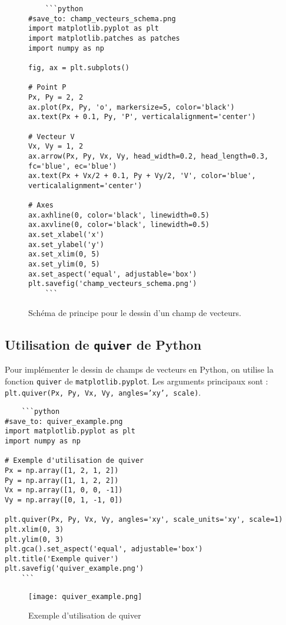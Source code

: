 \documentclass[oneside]{book}
\begin{document}
\begin{figure}[H]
    \centering
    \begin{verbatim}
    ```python
#save_to: champ_vecteurs_schema.png
import matplotlib.pyplot as plt
import matplotlib.patches as patches
import numpy as np

fig, ax = plt.subplots()

# Point P
Px, Py = 2, 2
ax.plot(Px, Py, 'o', markersize=5, color='black')
ax.text(Px + 0.1, Py, 'P', verticalalignment='center')

# Vecteur V
Vx, Vy = 1, 2
ax.arrow(Px, Py, Vx, Vy, head_width=0.2, head_length=0.3, fc='blue', ec='blue')
ax.text(Px + Vx/2 + 0.1, Py + Vy/2, 'V', color='blue', verticalalignment='center')

# Axes
ax.axhline(0, color='black', linewidth=0.5)
ax.axvline(0, color='black', linewidth=0.5)
ax.set_xlabel('x')
ax.set_ylabel('y')
ax.set_xlim(0, 5)
ax.set_ylim(0, 5)
ax.set_aspect('equal', adjustable='box')
plt.savefig('champ_vecteurs_schema.png')
    ```
    \end{verbatim}
    \caption{Schéma de principe pour le dessin d'un champ de vecteurs.}
    \label{fig:champ_vecteurs_schema}
\end{figure}

\subsection{Utilisation de \texttt{quiver} de Python}

Pour implémenter le dessin de champs de vecteurs en Python, on utilise la fonction \texttt{quiver} de \texttt{matplotlib.pyplot}. Les arguments principaux sont : \texttt{plt.quiver(Px, Py, Vx, Vy, angles='xy', scale)}.

\begin{verbatim}
    ```python
#save_to: quiver_example.png
import matplotlib.pyplot as plt
import numpy as np

# Exemple d'utilisation de quiver
Px = np.array([1, 2, 1, 2])
Py = np.array([1, 1, 2, 2])
Vx = np.array([1, 0, 0, -1])
Vy = np.array([0, 1, -1, 0])

plt.quiver(Px, Py, Vx, Vy, angles='xy', scale_units='xy', scale=1)
plt.xlim(0, 3)
plt.ylim(0, 3)
plt.gca().set_aspect('equal', adjustable='box')
plt.title('Exemple quiver')
plt.savefig('quiver_example.png')
    ```
\end{verbatim}

\begin{figure}[H]
    \centering
    \texttt{[image: quiver\_example.png]}
    \caption{Exemple d'utilisation de quiver}
    \label{fig:quiver_example}
\end{figure}
\end{document}

